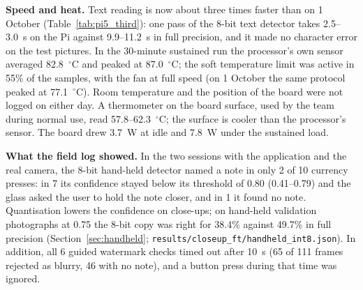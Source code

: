\textbf{Speed and heat.} Text reading is now about three times faster than on 1 October (Table~\ref{tab:pi5_third}): one pass of the 8-bit text detector takes 2.5--3.0~s on the Pi against 9.9--11.2~s in full precision, and it made no character error on the test pictures. In the 30-minute sustained run the processor's own sensor averaged 82.8~$^\circ$C and peaked at 87.0~$^\circ$C; the soft temperature limit was active in 55\% of the samples, with the fan at full speed (on 1 October the same protocol peaked at 77.1~$^\circ$C). Room temperature and the position of the board were not logged on either day. A thermometer on the board surface, used by the team during normal use, read 57.8--62.3~$^\circ$C; the surface is cooler than the processor's sensor. The board drew 3.7~W at idle and 7.8~W under the sustained load.

\textbf{What the field log showed.} In the two sessions with the application and the real camera, the 8-bit hand-held detector named a note in only 2 of 10 currency presses: in 7 its confidence stayed below its threshold of 0.80 (0.41--0.79) and the glass asked the user to hold the note closer, and in 1 it found no note. Quantisation lowers the confidence on close-ups; on hand-held validation photographs at 0.75 the 8-bit copy was right for 38.4\% against 49.7\% in full precision (Section~\ref{sec:handheld}; \texttt{results/closeup\_ft/handheld\_int8.json}). In addition, all 6 guided watermark checks timed out after 10~s (65 of 111 frames rejected as blurry, 46 with no note), and a button press during that time was ignored.

